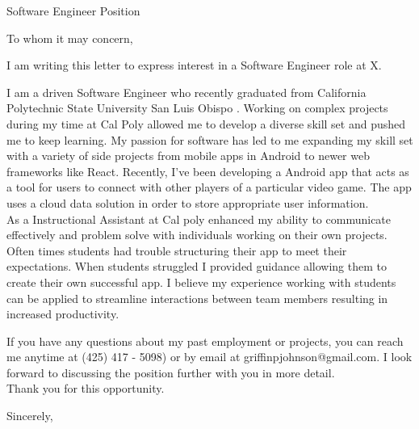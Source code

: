 \documentclass[]{letter}
\makeatletter
\newcommand{\role}{Software Engineer }
\newcommand{\company}{X}
\newcommand{\companyName}{\role role at \company}
\newcommand{\university}
{
	California Polytechnic State University San Luis Obispo
}
\newcommand{\email}{griffinpjohnson@gmail.com}
\newcommand{\phoneNum}{(425) 417 - 5098) }
\makeatother
\begin{document}

\begin{letter}
{
	\role Position
}

\address
{
	1200 Oceanaire Dr Apt B \\
	San Luis Obispo, CA 93405 
}

\opening{To whom it may concern,}

I am writing this letter to express interest in a \companyName .

I am a driven Software Engineer who recently graduated from \university . Working on complex projects during my time at Cal Poly allowed me to develop a diverse skill set and pushed me to keep learning. My passion for software has led to me expanding my skill set with a variety of side projects from mobile apps in Android to newer web frameworks like React. Recently, I've been developing a Android app that acts as a tool for users to connect with other players of a particular video game. The app uses a cloud data solution in order to store appropriate user information.\\ 


As a Instructional Assistant at Cal poly enhanced my ability to communicate effectively and problem solve with individuals working on their own projects. Often times students had trouble structuring their app to meet their expectations. When students struggled I provided guidance allowing them to create their own successful app. I believe my experience working with students can be applied to streamline interactions between team members resulting in increased productivity. 

If you have any questions about my past employment or projects, you can reach me anytime at \phoneNum or by email at \email. I look forward to discussing the position further with you in more detail.  \\

Thank you for this opportunity.

\signature
{ 
	Griffin Johnson
}


\closing
{
	Sincerely,
}


\end{letter}
\end{document}
